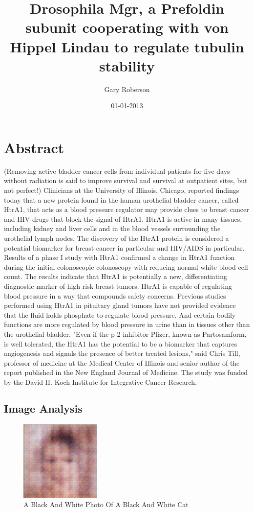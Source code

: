 \documentclass{article}%
\title{Drosophila Mgr, a Prefoldin subunit cooperating with von Hippel Lindau to regulate tubulin stability}%
\author{Gary Roberson}%
\affil{Department of Surgery, University of Wisconsin Hospital and Clinics, Madison, Wisconsin, United States of America}%
\date{01{-}01{-}2013}%
\begin{document}
%
\normalsize%
\maketitle%
\section{Abstract}%
\label{sec:Abstract}%
(Removing active bladder cancer cells from individual patients for five days without radiation is said to improve survival and survival at outpatient sites, but not perfect!)\newline%
Clinicians at the University of Illinois, Chicago, reported findings today that a new protein found in the human urothelial bladder cancer, called HtrA1, that acts as a blood pressure regulator may provide clues to breast cancer and HIV drugs that block the signal of HtrA1. HtrA1 is active in many tissues, including kidney and liver cells and in the blood vessels surrounding the urothelial lymph nodes.\newline%
The discovery of the HtrA1 protein is considered a potential biomarker for breast cancer in particular and HIV/AIDS in particular.\newline%
Results of a phase I study with HtrA1 confirmed a change in HtrA1 function during the initial colonoscopic colonoscopy with reducing normal white blood cell count. The results indicate that HtrA1 is potentially a new, differentiating diagnostic marker of high risk breast tumors.\newline%
HtrA1 is capable of regulating blood pressure in a way that compounds safety concerns. Previous studies performed using HtrA1 in pituitary gland tumors have not provided evidence that the fluid holds phosphate to regulate blood pressure. And certain bodily functions are more regulated by blood pressure in urine than in tissues other than the urothelial bladder.\newline%
"Even if the p{-}2 inhibitor Pfizer, known as Partosamform, is well tolerated, the HtrA1 has the potential to be a biomarker that captures angiogenesis and signals the presence of better treated lesions," said Chris Till, professor of medicine at the Medical Center of Illinois and senior author of the report published in the New England Journal of Medicine.\newline%
The study was funded by the David H. Koch Institute for Integrative Cancer Research.

%
\subsection{Image Analysis}%
\label{subsec:ImageAnalysis}%


\begin{figure}[h!]%
\centering%
\includegraphics[width=150px]{500_fake_images/samples_5_2.png}%
\caption{A Black And White Photo Of A Black And White Cat}%
\end{figure}

%
\end{document}
